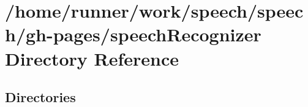 \section{/home/runner/work/speech/speech/gh-\/pages/speech\+Recognizer Directory Reference}
\label{dir_13f4227c1b9d50878659519750692a08}
\subsection*{Directories}
\begin{DoxyCompactItemize}
\end{DoxyCompactItemize}
